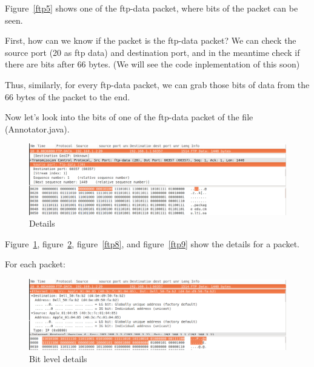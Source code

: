 Figure~\ref{ftp5} shows one of the ftp-data packet, where bits of the packet
can be seen.

First, how can we know if the packet is the ftp-data packet? We can
check the source port (20 as ftp data) and destination port, and in
the meantime check if there are bits after 66 bytes. (We will see the
code inplementation of this soon)

Thus, similarly, for every ftp-data packet, we can grab those bits of
data from the 66 bytes of the packet to the end.

Now let's look into the bits of one of the ftp-data packet of the file
(Annotator.java).

\begin{figure}[ht!]
\centering
\includegraphics[scale=0.35]{eps/ftp6.eps}
\caption{Details}
\label{ftp6}
\end{figure}

Figure~\ref{ftp6}, figure~\ref{ftp7}, figure~\ref{ftp8}, and 
figure~\ref{ftp9} 
show the details for a packet. 

\newpage
For each packet:

\begin{figure}[ht!]
\centering
\includegraphics[scale=0.35]{eps/ftp7.eps}
\caption{Bit level details}
\label{ftp7}
\end{figure}


